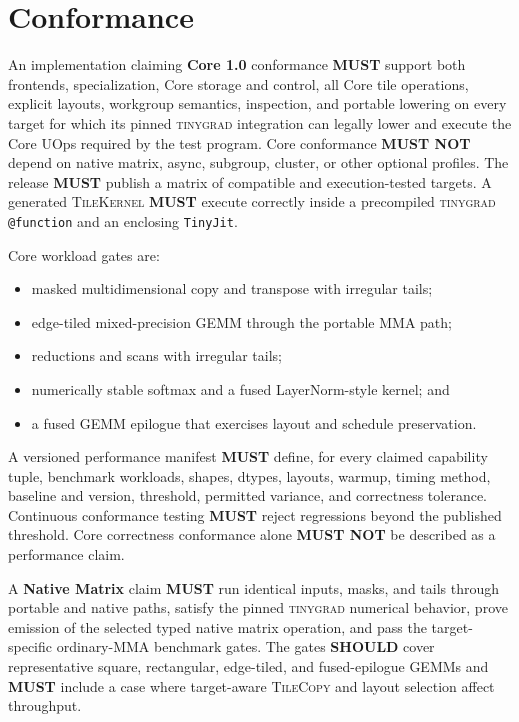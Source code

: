 \documentclass[10pt,letterpaper]{article}
\newcommand{\tinygrad}{\textsc{tinygrad}}
\newcommand{\op}[1]{\textsc{#1}}
\newcommand{\must}{\textbf{MUST}}
\newcommand{\mustnot}{\textbf{MUST NOT}}
\newcommand{\should}{\textbf{SHOULD}}
\begin{document}
\section*{Conformance}

An implementation claiming \textbf{Core 1.0} conformance \must{} support both
frontends, specialization, Core storage and control, all Core tile operations,
explicit layouts, workgroup semantics, inspection, and portable lowering on
every target for which its pinned \tinygrad{} integration can legally lower and
execute the Core UOps required by the test program. Core conformance \mustnot{}
depend on native matrix, async, subgroup, cluster, or other optional profiles.
The release \must{} publish a matrix of compatible and execution-tested targets.
A generated \op{TileKernel} \must{} execute correctly inside a precompiled
\tinygrad{} \texttt{@function} and an enclosing \texttt{TinyJit}.

Core workload gates are:

\begin{itemize}
  \item masked multidimensional copy and transpose with irregular tails;
  \item edge-tiled mixed-precision GEMM through the portable \op{MMA} path;
  \item reductions and scans with irregular tails;
  \item numerically stable softmax and a fused LayerNorm-style kernel; and
  \item a fused GEMM epilogue that exercises layout and schedule preservation.
\end{itemize}

A versioned performance manifest \must{} define, for every claimed capability
tuple, benchmark workloads, shapes, dtypes, layouts, warmup, timing method,
baseline and version, threshold, permitted variance, and correctness tolerance.
Continuous conformance testing \must{} reject regressions beyond the published
threshold. Core correctness conformance alone \mustnot{} be described as a
performance claim.

A \textbf{Native Matrix} claim \must{} run identical inputs, masks, and tails
through portable and native paths, satisfy the pinned \tinygrad{} numerical
behavior, prove emission of the selected typed native matrix operation, and
pass the target-specific ordinary-MMA benchmark gates. The gates \should{} cover
representative square, rectangular, edge-tiled, and fused-epilogue GEMMs and
\must{} include a case where target-aware \op{TileCopy} and layout selection
affect throughput.
\end{document}
